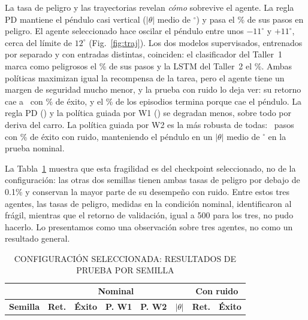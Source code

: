 \documentclass[conference]{IEEEtran}
\begin{document}
La tasa de peligro y las trayectorias revelan \emph{cómo} sobrevive el agente. La regla PD
mantiene el péndulo casi vertical ($|\theta|$ medio de \TestPDTheta$^\circ$) y pasa el
\TestPDDanger\% de sus pasos en peligro. El agente seleccionado hace oscilar el péndulo entre
unos $-11^\circ$ y $+11^\circ$, cerca del límite de $12^\circ$ (Fig.~\ref{fig:traj}). Los dos
modelos supervisados, entrenados por separado y con entradas distintas, coinciden: el
clasificador del Taller~1 marca como peligrosos el \TestDQNDanger\% de sus pasos y la LSTM
del Taller~2 el \TestDQNDangerWTwo\%. Ambas políticas maximizan igual la recompensa de la
tarea, pero el agente tiene un margen de seguridad mucho menor, y la prueba con ruido lo deja
ver: su retorno cae a \NoisyDQNMean\ con \NoisyDQNSuccess\% de éxito, y el
\NoisyDQNThetaFail\% de los episodios termina porque cae el péndulo. La regla PD
(\NoisyPDMean) y la política guiada por W1 (\NoisyWOneMean) se degradan menos, sobre todo
por deriva del carro. La política guiada por W2 es la más robusta de todas:
\NoisyWTwoMean\ pasos con \NoisyWTwoSuccess\% de éxito con ruido, manteniendo el péndulo en
un $|\theta|$ medio de \TestWTwoTheta$^\circ$ en la prueba nominal.

La Tabla~\ref{tab:seeds} muestra que esta fragilidad es del checkpoint seleccionado, no de
la configuración: las otras dos semillas tienen ambas tasas de peligro por debajo de 0.1\%
y conservan la mayor parte de su desempeño con ruido. Entre estos tres agentes, las tasas de
peligro, medidas en la condición nominal, identificaron al frágil, mientras que el retorno de
validación, igual a 500 para los tres, no pudo hacerlo. Lo presentamos como una observación
sobre tres agentes, no como un resultado general.

\begin{table}[t]
\caption{CONFIGURACIÓN SELECCIONADA: RESULTADOS DE PRUEBA POR SEMILLA}
\label{tab:seeds}
\centering
\small
\setlength{\tabcolsep}{3pt}
\begin{tabular}{|l|c|c|c|c|c||c|c|}
\hline
& \multicolumn{5}{c||}{\textbf{Nominal}} & \multicolumn{2}{c|}{\textbf{Con ruido}} \\ \hline
\textbf{Semilla} & \textbf{Ret.} & \textbf{Éxito} & \textbf{P. W1} & \textbf{P. W2} & $|\theta|$ & \textbf{Ret.} & \textbf{Éxito} \\ \hline

\end{tabular}
\end{table}
\end{document}
